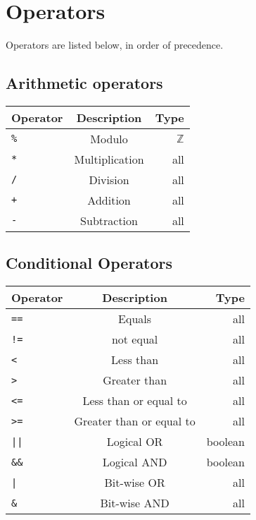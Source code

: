 \documentclass[
a4paper, %
11pt, %
onecolumn, %
openany, %
]{memoir}
\begin{document}
\section{Operators}
Operators are listed below, in order of precedence.\\
\subsection{Arithmetic operators}
\begin{tabular}{| l | c | r |}
\hline
Operator    & Description     & Type\\
\hline
\texttt{\%} & Modulo          & $\mathbb{Z}$ \\
\hline
\texttt{*}  & Multiplication  & all \\
\hline
\texttt{/}  & Division        & all \\
\hline
\texttt{+}  & Addition        & all \\
\hline
\texttt{-}  & Subtraction     & all \\
\hline
\end{tabular}

\subsection{Conditional Operators}

\begin{tabular}{| l | c | r |}
\hline
Operator    & Description     & Type\\
\hline
\texttt{==} & Equals          & all \\
\hline
\texttt{!=} & not equal       & all \\
\hline
\texttt{<}  & Less than       & all \\
\hline
\texttt{>}  & Greater than    & all \\
\hline
\texttt{<=}  & Less than or equal to     & all \\
\hline
\texttt{>=}  & Greater than or equal to     & all \\
\hline
\texttt{||}  & Logical OR    & boolean \\
\hline
\texttt{\&\&}  & Logical AND   & boolean \\
\hline
\texttt{|}  & Bit-wise OR     & all \\
\hline
\texttt{\&}  & Bit-wise AND     & all \\
\hline
\end{tabular}

\end{document}
